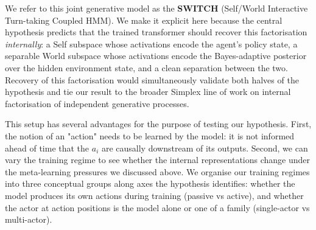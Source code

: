 \documentclass[11pt]{article}
\begin{document}
We refer to this joint generative model as the \textbf{SWITCH} (Self/World Interactive Turn-taking Coupled HMM). We make it explicit here because the central hypothesis predicts that the trained transformer should recover this factorisation \emph{internally}: a Self subspace whose activations encode the agent's policy state, a separable World subspace whose activations encode the Bayes-adaptive posterior over the hidden environment state, and a clean separation between the two. Recovery of this factorisation would simultaneously validate both halves of the hypothesis and tie our result to the broader Simplex line of work on internal factorisation of independent generative processes.

This setup has several advantages for the purpose of testing our hypothesis. First, the notion of an "action" needs to be learned by the model: it is not informed ahead of time that the $a_i$ are causally downstream of its outputs. Second, we can vary the training regime to see whether the internal representations change under the meta-learning pressures we discussed above. We organise our training regimes into three conceptual groups along axes the hypothesis identifies: whether the model produces its own actions during training (passive vs active), and whether the actor at action positions is the model alone or one of a family (single-actor vs multi-actor).
\end{document}
